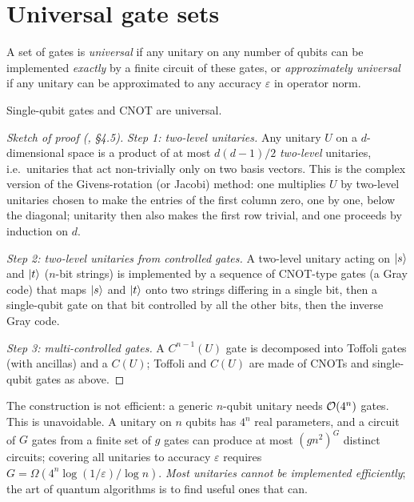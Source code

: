 \section{Universal gate sets}\label{sec:universal}
\begin{definition}
A set of gates is \emph{universal} if any unitary on any number of qubits can be implemented \emph{exactly} by a finite circuit of these gates, or \emph{approximately universal}
if any unitary can be approximated to any accuracy $\varepsilon$ in operator norm.
\end{definition}
\begin{theorem}
Single-qubit gates and CNOT are universal.
\end{theorem}
\begin{proof}[Sketch of proof (\cite{NielsenChuang}, \S4.5)]
\emph{Step 1: two-level unitaries.} Any unitary $U$ on a $d$-dimensional space is a product of at most $d(d-1)/2$ \emph{two-level} unitaries, i.e.\ unitaries that act non-trivially only
on two basis vectors. This is the complex version of the Givens-rotation (or Jacobi) method: one multiplies $U$ by two-level unitaries chosen to make the entries of the first column zero,
one by one, below the diagonal; unitarity then also makes the first row trivial, and one proceeds by induction on $d$.

\emph{Step 2: two-level unitaries from controlled gates.} A two-level unitary acting on $\left|s\right\rangle$ and $\left|t\right\rangle$ ($n$-bit strings) is implemented by a sequence of CNOT-type gates (a Gray
code) that maps $\left|s\right\rangle$ and $\left|t\right\rangle$ onto two strings differing in a single bit, then a single-qubit gate on that bit controlled by all the other bits, then the inverse Gray code.

\emph{Step 3: multi-controlled gates.} A $C^{n-1}(U)$ gate is decomposed into Toffoli gates (with ancillas) and a $C(U)$; Toffoli and $C(U)$ are made of CNOTs and single-qubit gates as above.
\end{proof}
The construction is not efficient: a generic $n$-qubit unitary needs $\mathcal O(4^n)$ gates. This is unavoidable. A unitary on $n$ qubits has $4^n$ real parameters, and a circuit of $G$ gates from
a finite set of $g$ gates can produce at most $(gn^2)^G$ distinct circuits; covering all unitaries to accuracy $\varepsilon$ requires $G=\Omega(4^n\log(1/\varepsilon)/\log n)$.
\emph{Most unitaries cannot be implemented efficiently}; the art of quantum algorithms is to find useful ones that can.


